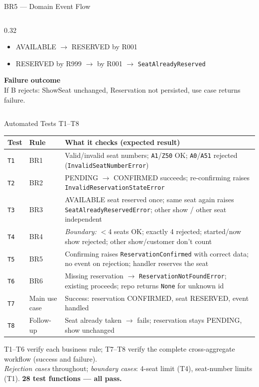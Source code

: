 \documentclass[aspectratio=169,11pt]{beamer}
\newcommand{\code}[1]{\texttt{#1}}
\begin{document}
\begin{frame}{BR5 --- Domain Event Flow}
\begin{columns}[t]
\begin{column}{0.32\textwidth}
      \begin{itemize}
        \item AVAILABLE $\rightarrow$ RESERVED by R001 \checkmark
        \item RESERVED by R999 $\rightarrow$ by R001 
              $\rightarrow$ \code{SeatAlreadyReserved}
      \end{itemize}
      \textbf{Failure outcome}\\
      If B rejects: ShowSeat unchanged, Reservation not persisted,
      use case returns failure.
    \end{column}
  \end{columns}
\end{frame}

\begin{frame}{Automated Tests T1--T8}
  \centering
  \scriptsize
  \begin{tabularx}{\textwidth}{@{}l l X@{}}
    \toprule
    \textbf{Test} & \textbf{Rule} & \textbf{What it checks (expected result)} \\
    \midrule
    \code{T1} & BR1 & Valid/invalid seat numbers; \code{A1}/\code{Z50} OK;
      \code{A0}/\code{A51} rejected (\code{InvalidSeatNumberError}) \\
    \code{T2} & BR2 & PENDING $\rightarrow$ CONFIRMED succeeds; re-confirming raises
      \code{InvalidReservationStateError} \\
    \code{T3} & BR3 & AVAILABLE seat reserved once; same seat again raises
      \code{SeatAlreadyReservedError}; other show / other seat independent \\
    \code{T4} & BR4 & \emph{Boundary:} $<$4 seats OK; exactly 4 rejected; started/now
      show rejected; other show/customer don't count \\
    \code{T5} & BR5 & Confirming raises \code{ReservationConfirmed} with correct
      data; no event on rejection; handler reserves the seat \\
    \code{T6} & BR6 & Missing reservation $\rightarrow$ \code{ReservationNotFoundError};
      existing proceeds; repo returns \code{None} for unknown id \\
    \code{T7} & Main use case & Success: reservation CONFIRMED, seat RESERVED,
      event handled \\
    \code{T8} & Follow-up & Seat already taken $\rightarrow$ fails; reservation stays
      PENDING, show unchanged \\
    \bottomrule
  \end{tabularx}

  \vspace{0.2cm}
  {\scriptsize T1--T6 verify each business rule; T7--T8 verify the complete
  cross-aggregate workflow (success and failure).\\
  \emph{Rejection cases} throughout; \emph{boundary cases}: 4-seat limit (T4),
  seat-number limits (T1). \textbf{28 test functions --- all pass.}}
\end{frame}
\end{document}
